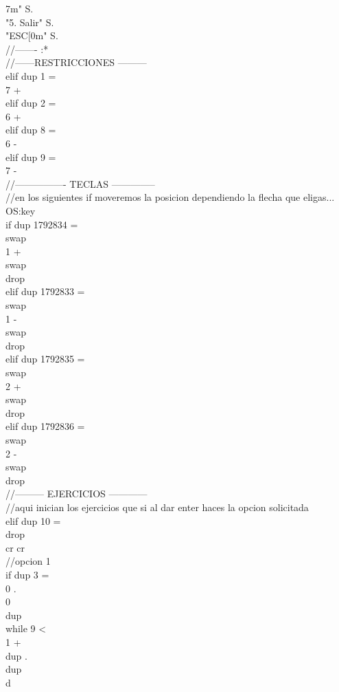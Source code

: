 \documentclass[conference]{IEEEtran}
\begin{document}
\begin{enumerate}
\begin{center}
7m" S. \\ "5. Salir" S. \\ "ESC[0m" S. \\ //------- :* \\ //------RESTRICCIONES --------- \\ elif dup 1 = \\ 7 + \\ elif dup 2 = \\ 6 + \\ elif dup 8 = \\ 6 - \\ elif dup 9 = \\ 7 - \\ //---------------- TECLAS -------------- \\ //en los siguientes if moveremos la posicion dependiendo la flecha que eligas... \\ OS:key \\ if dup 1792834 = \\ swap \\ 1 + \\ swap \\ drop \\ elif dup 1792833 = \\ swap \\ 1 - \\ swap \\ drop \\ elif dup 1792835 = \\ swap \\ 2 + \\ swap \\ drop \\ elif dup 1792836 = \\ swap \\ 2 - \\ swap \\ drop \\  //--------- EJERCICIOS ------------ \\ //aqui inician los ejercicios que si al dar enter haces la opcion solicitada \\ elif dup 10 = \\ drop \\ cr cr \\ //opcion 1 \\ if dup 3 = \\ 0 . \\ 0 \\ dup \\ while 9 < \\  1 + \\ dup . \\ dup \\ d
\end{center}
\end{enumerate}
\end{document}
